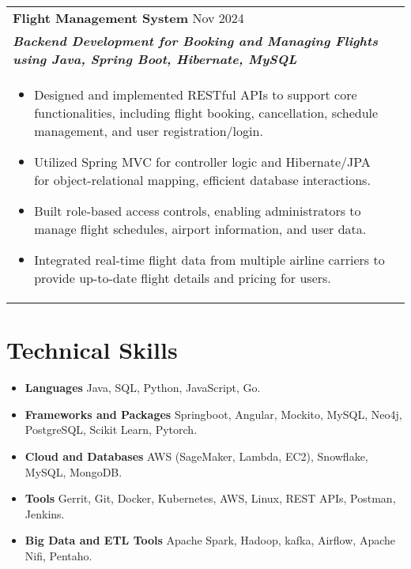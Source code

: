 \documentclass[a4paper,3pt]{article}
\begin{document}
\begin{tabularx}{\linewidth}{ @{}l r@{} }
\textbf{Flight Management System} \hspace*{69ex} Nov 2024\\[2pt]
\textbf{\textit{Backend Development for Booking and Managing Flights using Java, Spring Boot, Hibernate, MySQL}} \hfill\\[2pt]
\begin{minipage}[t]{\linewidth}
    \begin{itemize}[nosep,after=\strut, leftmargin=2em, itemsep=2pt]
        \item Designed and implemented RESTful APIs to support core functionalities, including flight booking, cancellation, schedule management, and user registration/login.
\item Utilized Spring MVC for controller logic and Hibernate/JPA for object-relational mapping, efficient database interactions.
\item Built role-based access controls, enabling administrators to manage flight schedules, airport information, and user data.
\item Integrated real-time flight data from multiple airline carriers to provide up-to-date flight details and pricing for users.    
    \end{itemize}
    \end{minipage}
\end{tabularx}


\section{Technical Skills}
\begin{itemize}[nosep,after=\strut, leftmargin=2em, itemsep=1pt]
\item \textbf{Languages}
\hspace*{18.5ex}                  Java, SQL, Python, JavaScript, Go.
\item \textbf{Frameworks and Packages}
 \hspace*{4ex} Springboot, Angular, Mockito, MySQL, Neo4j, PostgreSQL, Scikit Learn, Pytorch.
\item\textbf{Cloud and Databases}
 \hspace*{9.2ex} AWS (SageMaker, Lambda, EC2), Snowflake, MySQL, MongoDB.
 \item\textbf{Tools}
 \hspace*{23.8ex} Gerrit, Git, Docker, Kubernetes, AWS, Linux, REST APIs, Postman, Jenkins.
\item\textbf{Big Data and ETL Tools}
 \hspace*{7.3ex} Apache Spark, Hadoop, kafka, Airflow, Apache Nifi, Pentaho.
 \end{itemize}
\end{document}
